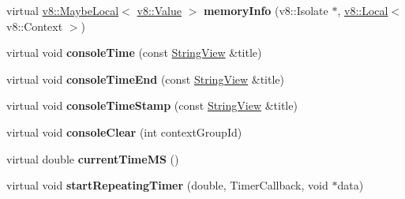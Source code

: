 \begin{DoxyCompactItemize}
\item 
\mbox{\label{classv8__inspector_1_1V8InspectorClient_aa0ae6992f007803302cb64d3d0461a20}} 
virtual \mbox{\hyperlink{classv8_1_1MaybeLocal}{v8\+::\+Maybe\+Local}}$<$ \mbox{\hyperlink{classv8_1_1Value}{v8\+::\+Value}} $>$ {\bfseries memory\+Info} (v8\+::\+Isolate $\ast$, \mbox{\hyperlink{classv8_1_1Local}{v8\+::\+Local}}$<$ v8\+::\+Context $>$)
\item 
\mbox{\label{classv8__inspector_1_1V8InspectorClient_a7b0e3b6ae4473671ed80e38153cbcec9}} 
virtual void {\bfseries console\+Time} (const \mbox{\hyperlink{classv8__inspector_1_1StringView}{String\+View}} \&title)
\item 
\mbox{\label{classv8__inspector_1_1V8InspectorClient_a914e850d1e61bfe2fce9f74022ab7a98}} 
virtual void {\bfseries console\+Time\+End} (const \mbox{\hyperlink{classv8__inspector_1_1StringView}{String\+View}} \&title)
\item 
\mbox{\label{classv8__inspector_1_1V8InspectorClient_a2e4593fbf351c48a21006a36db1cc3cd}} 
virtual void {\bfseries console\+Time\+Stamp} (const \mbox{\hyperlink{classv8__inspector_1_1StringView}{String\+View}} \&title)
\item 
\mbox{\label{classv8__inspector_1_1V8InspectorClient_a05b99b6be7f74d53a743e16592d6e38f}} 
virtual void {\bfseries console\+Clear} (int context\+Group\+Id)
\item 
\mbox{\label{classv8__inspector_1_1V8InspectorClient_ac27be4891cda5413f6156df6c98dc831}} 
virtual double {\bfseries current\+Time\+MS} ()
\item 
\mbox{\label{classv8__inspector_1_1V8InspectorClient_a33a58cb593cb4a4fefae32ec2c23ac72}} 
virtual void {\bfseries start\+Repeating\+Timer} (double, Timer\+Callback, void $\ast$data)
\item 
\mbox{\label{classv8__inspector_1_1V8InspectorClient_afb117003d8793ca5fdf3a7aabd909936}} 

\end{DoxyCompactItemize}
